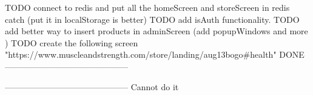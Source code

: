 TODO connect to redis and put all the homeScreen and storeScreen
        in redis catch (put it in localStorage is better)
TODO add isAuth functionality.
TODO add better way to insert products in adminScreen (add popupWindows and more )
TODO create the following screen "https://www.muscleandstrength.com/store/landing/aug13bogo#health"
DONE
--------------------------------------------



--------------------------------------------
Cannot do it